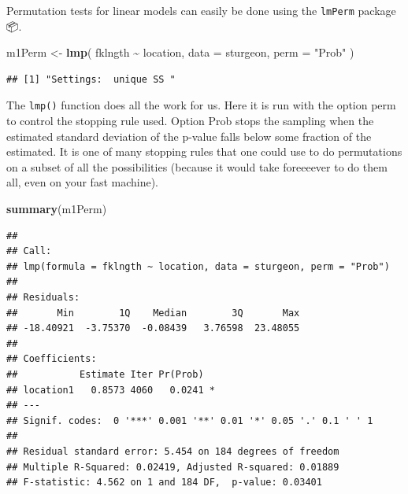 \documentclass[
  12pt,
]{book}
\newenvironment{Shaded}{\begin{snugshade}}{\end{snugshade}}
\newcommand{\DataTypeTok}[1]{\textcolor[rgb]{0.13,0.29,0.53}{#1}}
\newcommand{\KeywordTok}[1]{\textcolor[rgb]{0.13,0.29,0.53}{\textbf{#1}}}
\newcommand{\NormalTok}[1]{#1}
\newcommand{\OperatorTok}[1]{\textcolor[rgb]{0.81,0.36,0.00}{\textbf{#1}}}
\newcommand{\StringTok}[1]{\textcolor[rgb]{0.31,0.60,0.02}{#1}}
\begin{document}
Permutation tests for linear models can easily be done using the \texttt{lmPerm} package 📦.

\begin{Shaded}
\begin{Highlighting}[]
\NormalTok{m1Perm \textless{}{-}}\StringTok{ }\KeywordTok{lmp}\NormalTok{(}
\NormalTok{  fklngth }\OperatorTok{\textasciitilde{}}\StringTok{ }\NormalTok{location,}
  \DataTypeTok{data =}\NormalTok{ sturgeon,}
  \DataTypeTok{perm =} \StringTok{"Prob"}
\NormalTok{)}
\end{Highlighting}
\end{Shaded}

\begin{verbatim}
## [1] "Settings:  unique SS "
\end{verbatim}

The \texttt{lmp()} function does all the work for us. Here it is run with the option perm to control the stopping rule used. Option Prob stops the sampling when the estimated standard deviation of the p-value falls below some fraction of the estimated. It is one of many stopping rules that one could use to do permutations on a subset of all the possibilities (because it would take foreeeever to do them all, even on your fast machine).

\begin{Shaded}
\begin{Highlighting}[]
\KeywordTok{summary}\NormalTok{(m1Perm)}
\end{Highlighting}
\end{Shaded}

\begin{verbatim}
## 
## Call:
## lmp(formula = fklngth ~ location, data = sturgeon, perm = "Prob")
## 
## Residuals:
##       Min        1Q    Median        3Q       Max 
## -18.40921  -3.75370  -0.08439   3.76598  23.48055 
## 
## Coefficients:
##           Estimate Iter Pr(Prob)  
## location1   0.8573 4060   0.0241 *
## ---
## Signif. codes:  0 '***' 0.001 '**' 0.01 '*' 0.05 '.' 0.1 ' ' 1
## 
## Residual standard error: 5.454 on 184 degrees of freedom
## Multiple R-Squared: 0.02419, Adjusted R-squared: 0.01889 
## F-statistic: 4.562 on 1 and 184 DF,  p-value: 0.03401
\end{verbatim}
\end{document}
